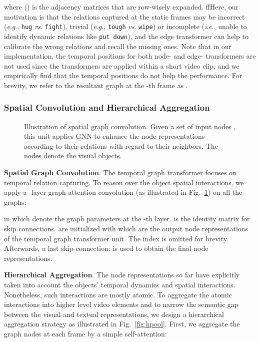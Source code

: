 \documentclass[10pt,journal,compsoc]{IEEEtran}
\newcommand{\vs}{\textit{vs}. }
\newcommand{\ie}{\textit{i}.\textit{e}.}
\newcommand{\eg}{\textit{e}.\textit{g}.}
\begin{document}
where  () is the  adjacency matrices that are row-wisely expanded. ffHere, our motivation is that the relations captured at the static frames may be incorrect (\eg, \texttt{hug} \vs \texttt{fight}), trivial (\eg, \texttt{tough} \vs \texttt{wipe}) or incomplete (\ie, unable to identify dynamic relations like \texttt{put down}), and the edge transformer can help to calibrate the wrong relations and recall the missing ones. Note that in our implementation, the temporal positions for both node- and edge- transformers are not used since the transformers are applied within a short video clip, and we empirically find that the temporal positions do not help the performance. For brevity, we refer to the resultant graph at the -th frame as . 

\subsubsection{Spatial Convolution and Hierarchical Aggregation}
\begin{figure}[t]
  \begin{center}
  \end{center}
  \vspace{-0.3cm}
  \caption{Illustration of spatial graph convolution. Given a set of input nodes , this unit applies GNN to enhance the node representations according to their relations with regard to their neighbors. The nodes denote the visual objects.}
\label{fig:gr}
\end{figure}
\textbf{Spatial Graph Convolution}. The temporal graph transformer focuses on temporal relation capturing. To reason over the object spatial interactions, we apply a -layer graph attention convolution \cite{kipf2016semi} (as illustrated in Fig.~\ref{fig:gr}) on all the  graphs:

in which  denote the graph parameters at the -th layer.  is the identity matrix for skip connections.  are initialized with  which are the output node representations of the temporal graph transformer unit. The index  is omitted for brevity. Afterwards, a last skip-connection:  is used to obtain the final node representations. 

\noindent \textbf{Hierarchical Aggregation}.
The node representations so far have explicitly taken into account the objects' temporal dynamics and spatial interactions. Nonetheless, such interactions are mostly atomic. 
To aggregate the atomic interactions into higher level video elements and to narrow the semantic gap between the visual and textual representations, we design a hierarchical aggregation strategy as illustrated in Fig.~\ref{fig:hpool}. First, we aggregate the graph nodes at each frame by a simple self-attention:
\end{document}
